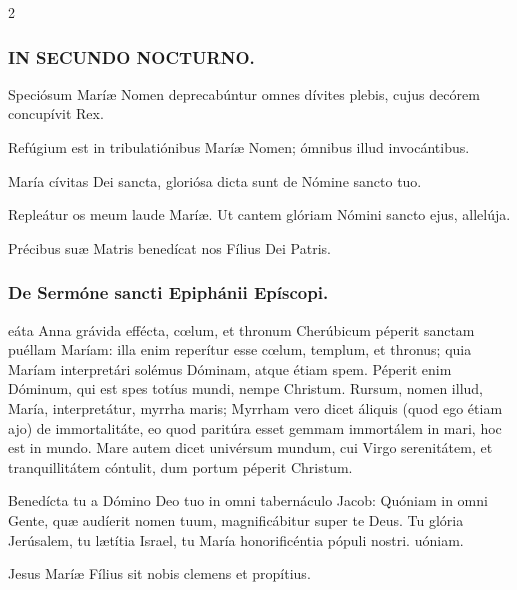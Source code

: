 \documentclass[9pt,twoside]{extarticle}
\begin{document}
\begin{multicols}{2}
\subsubsection*{\center \textsc{IN SECUNDO NOCTURNO.}}
\begin{tightlist}{}
\item {} Speciósum Maríæ Nomen deprecabúntur omnes dívites plebis, cujus decórem concupívit Rex.
\item {} Refúgium est in tribulatiónibus Maríæ Nomen; ómnibus illud invocántibus.
\item {} María cívitas Dei sancta, gloriósa dicta sunt de Nómine sancto tuo.
\item {} Repleátur os meum laude Maríæ.  Ut cantem glóriam Nómini sancto ejus, allelúja.
\item {\small {} Précibus suæ Matris benedícat nos Fílius Dei Patris.}
\end{tightlist}

\subsubsection*{\center De Sermóne sancti Epiphánii Epíscopi.}
\begin{center}\end{center}
eáta Anna grávida effécta, cœlum, et thronum Cherúbicum péperit sanctam puéllam Maríam: illa enim reperítur esse cœlum, templum, et thronus; quia Maríam interpretári solémus Dóminam, atque étiam spem. Péperit enim Dóminum, qui est spes totíus mundi, nempe Christum. Rursum, nomen illud, María, interpretátur, myrrha maris; Myrrham vero dicet áliquis (quod ego étiam ajo) de immortalitáte, eo quod paritúra esset gemmam immortálem in mari, hoc est in mundo. Mare autem dicet univérsum mundum, cui Virgo serenitátem, et tranquillitátem cóntulit, dum portum péperit Christum.

\begin{tightlist}{}
\item {} Benedícta tu a Dómino Deo tuo in omni tabernáculo Jacob: \textred{*} Quóniam in omni Gente, quæ audíerit nomen tuum, magnificábitur super te Deus.  Tu glória Jerúsalem, tu lætítia Israel, tu María honorificéntia pópuli nostri. uóniam.
\item {\small {} Jesus Maríæ Fílius sit nobis clemens et propítius.}
\end{tightlist}


\end{multicols}
\end{document}
